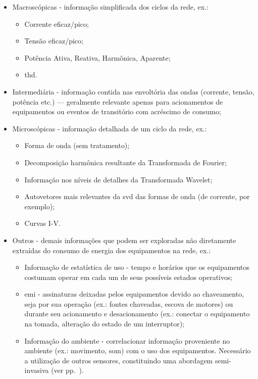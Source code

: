 \begin{itemize}
\item Macroscópicas - informação simplificada dos ciclos da rede, ex.:
\begin{itemize}
\item Corrente eficaz/pico;
\item Tensão eficaz/pico;
\item Potência Ativa, Reativa, Harmônica, Aparente;
\item \gls{thd}.
\end{itemize}
\item Intermediária - informação contida nas envoltória das ondas
(corrente, tensão, potência etc.) --- geralmente relevante apenas para
acionamentos de equipamentos ou eventos de transitório com acréscimo
de consumo;
\item Microscópicas - informação detalhada de um ciclo da rede, ex.:
\begin{itemize}
\item Forma de onda (sem tratamento);
\item Decomposição harmônica resultante da Transformada de Fourier;
\item Informação nos níveis de detalhes da Transformada Wavelet;
\item Autovetores mais relevantes da \gls{svd} das formas de onda (de
corrente, por exemplo);
\item Curvas I-V.
\end{itemize}
\item Outros - demais informações que podem ser exploradas não
diretamente extraídas do consumo de energia dos equipamentos na rede,
ex.:
\begin{itemize} 
\item Informação de estatística de uso - tempo e horários que os
equipamentos costumam operar em cada um de seus possíveis estados
operativos;
\item \gls{emi} - assinaturas deixadas pelos equipamentos devido ao
chaveamento, seja por sua operação (ex.: fontes chaveadas, escova de
motores) ou durante seu acionamento e desacionamento (ex.: conectar o
equipamento na tomada, alteração do estado de um interruptor);
\item Informação do ambiente - correlacionar informação proveniente no
ambiente (ex.: movimento, som) com o uso dos equipamentos. Necessário a
utilização de outros sensores, constituindo uma abordagem
semi-invasiva (ver pp.~\pageref{top:seminilm}).
\end{itemize}
\end{itemize}

